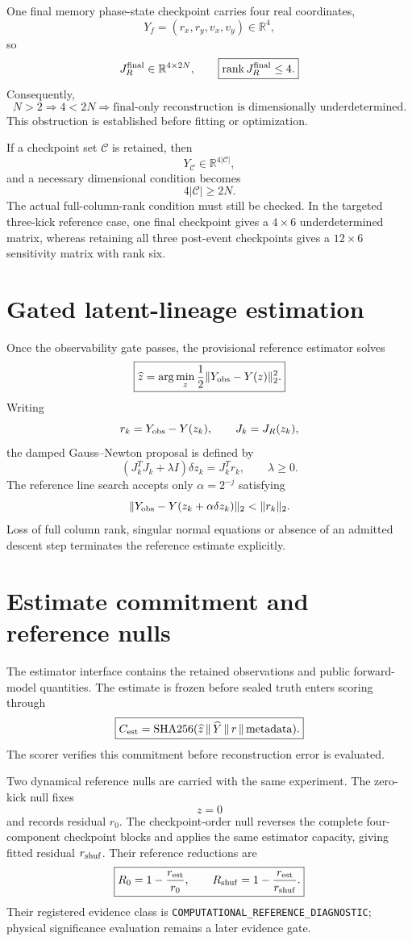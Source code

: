One final memory phase-state checkpoint carries four real coordinates,
\[
Y_f=(r_x,r_y,v_x,v_y)\in\mathbb R^4,
\]
so
\[
J_R^{\rm final}\in\mathbb R^{4\times2N},
\qquad
\boxed{\operatorname{rank}J_R^{\rm final}\le4.}
\]
Consequently,
\[
\boxed{
N>2
\Longrightarrow
4<2N
\Longrightarrow
\text{final-only reconstruction is dimensionally underdetermined}.
}
\]
This obstruction is established before fitting or optimization.

If a checkpoint set \(\mathcal C\) is retained, then
\[
Y_{\mathcal C}\in\mathbb R^{4|\mathcal C|},
\]
and a necessary dimensional condition becomes
\[
\boxed{4|\mathcal C|\ge2N.}
\]
The actual full-column-rank condition must still be checked. In the targeted three-kick reference case, one final checkpoint gives a \(4\times6\) underdetermined matrix, whereas retaining all three post-event checkpoints gives a \(12\times6\) sensitivity matrix with rank six.

\section{Gated latent-lineage estimation}

Once the observability gate passes, the provisional reference estimator solves
\[
\boxed{
\widehat z
=\arg\min_z\frac12\|Y_{\rm obs}-Y(z)\|_2^2.
}
\]
Writing
\[
r_k=Y_{\rm obs}-Y(z_k),
\qquad
J_k=J_R(z_k),
\]
the damped Gauss--Newton proposal is defined by
\[
\boxed{
(J_k^T J_k+\lambda I)\delta z_k
=J_k^T r_k,
\qquad \lambda\ge0.
}
\]
The reference line search accepts only \(\alpha=2^{-j}\) satisfying
\[
\|Y_{\rm obs}-Y(z_k+\alpha\delta z_k)\|_2
<\|r_k\|_2.
\]
Loss of full column rank, singular normal equations or absence of an admitted descent step terminates the reference estimate explicitly.

\section{Estimate commitment and reference nulls}

The estimator interface contains the retained observations and public forward-model quantities. The estimate is frozen before sealed truth enters scoring through
\[
\boxed{
C_{\rm est}
=\operatorname{SHA256}(\widehat z\,\|\,\widehat Y\,\|\,r\,\|\,\mathrm{metadata}).
}
\]
The scorer verifies this commitment before reconstruction error is evaluated.

Two dynamical reference nulls are carried with the same experiment. The zero-kick null fixes
\[
z=0
\]
and records residual \(r_0\). The checkpoint-order null reverses the complete four-component checkpoint blocks and applies the same estimator capacity, giving fitted residual \(r_{\rm shuf}\). Their reference reductions are
\[
\boxed{
R_0=1-\frac{r_{\rm est}}{r_0},
\qquad
R_{\rm shuf}=1-\frac{r_{\rm est}}{r_{\rm shuf}}.
}
\]
Their registered evidence class is \texttt{COMPUTATIONAL\_REFERENCE\_DIAGNOSTIC}; physical significance evaluation remains a later evidence gate.

